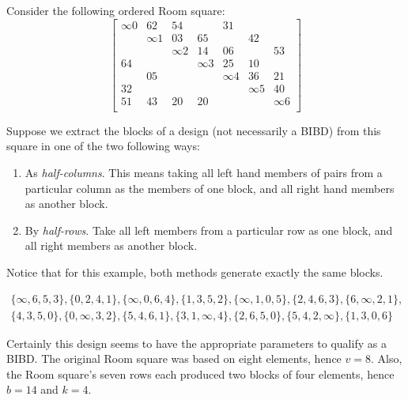 Consider the following ordered Room square:
\begin{equation}
  \begin{bmatrix}
    \infty 0 &    62    &    54    &            &    31    &            &          \\
             & \infty 1 &    03    &     65     &          &     42     &          \\
             &          & \infty 2 &     14     &    06    &            &    53    \\
      64     &          &          &  \infty 3  &    25    &     10     &          \\
             &    05    &          &            & \infty 4 &     36     &    21    \\
      32     &          &          &            &          &  \infty 5  &    40    \\
      51     &    43    &    20    &     20     &          &            & \infty 6 \\
  \end{bmatrix}
\end{equation}

Suppose we extract the blocks of a design (not necessarily a BIBD) from this square in one of the two following ways:

\begin{enumerate}
 \item{As \emph{half-columns}. This means taking all left hand
    members of pairs from a particular column as the members
    of one block, and all right hand members as another
    block.}
 \item{By \emph{half-rows}. Take all left members from a particular
    row as one block, and all right members as another
    block.}
\end{enumerate}

Notice that for this example, both methods generate exactly the same blocks.

\begin{equation}
\begin{split}
\{\infty,6,5,3\},\{0,2,4,1\},\{\infty,0,6,4\},\{1,3,5,2\},\{\infty,1,0,5\},\{2,4,6,3\},\{6, \infty,2,1\}, \\
\{4,3,5,0\},\{0,\infty,3,2\},\{5,4,6,1\},\{3,1,\infty,4\},\{2,6,5,0\},\{5,4,2,\infty\},\{1, 3,0,6\}
\end{split}
\end{equation}

Certainly this design seems to have the appropriate parameters to qualify as a BIBD.
The original Room square was based on eight elements, hence $v = 8$.
Also, the Room square’s seven rows each produced two blocks of four elements, hence $b = 14$ and $k = 4$.

